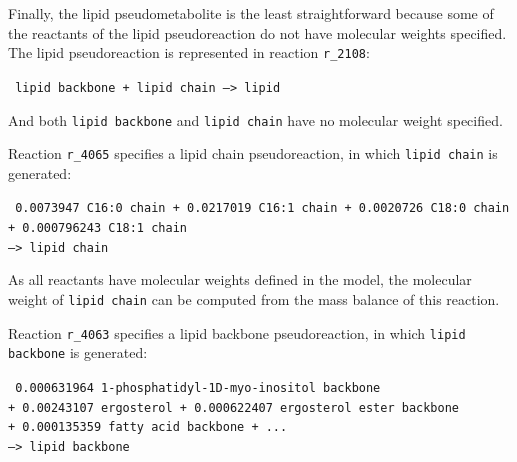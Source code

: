 Finally, the lipid pseudometabolite is the least straightforward because some of the reactants of the lipid pseudoreaction do not have molecular weights specified.
The lipid pseudoreaction is represented in reaction \texttt{r\_2108}:

\texttt{
  lipid backbone + lipid chain --> lipid
}

And both \texttt{lipid backbone} and \texttt{lipid chain} have no molecular weight specified.

Reaction \texttt{r\_4065} specifies a lipid chain pseudoreaction, in which \texttt{lipid chain} is generated:

\texttt{
  0.0073947 C16:0 chain + 0.0217019 C16:1 chain + 0.0020726 C18:0 chain \\
  + 0.000796243 C18:1 chain \\
  --> lipid chain
}

As all reactants have molecular weights defined in the model, the molecular weight of \texttt{lipid chain} can be computed from the mass balance of this reaction.

Reaction \texttt{r\_4063} specifies a lipid backbone pseudoreaction, in which \texttt{lipid backbone} is generated:

\texttt{
  0.000631964 1-phosphatidyl-1D-myo-inositol backbone\\
  + 0.00243107 ergosterol + 0.000622407 ergosterol ester backbone\\
  + 0.000135359 fatty acid backbone + ...\\
  --> lipid backbone
}

